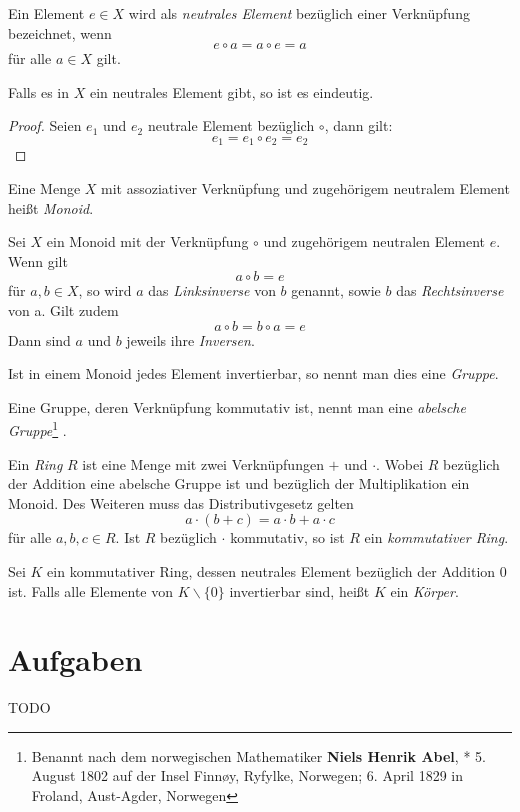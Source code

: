 \begin{definition}
Ein Element $e\in X$ wird als \textsl{neutrales Element} bezüglich einer Verknüpfung bezeichnet, wenn 
\[ e\circ a = a \circ e = a \]
für alle $a\in X$ gilt.
\end{definition}

\begin{claim}
Falls es in $X$ ein neutrales Element gibt, so ist es eindeutig. 
\end{claim}
\begin{proof}
Seien $e_1$ und $e_2$ neutrale Element bezüglich $\circ$, dann gilt: 
\[ e_1 = e_1\circ e_2 = e_2 \]
\end{proof}

\begin{definition}
Eine Menge $X$ mit assoziativer Verknüpfung und zugehörigem neutralem Element heißt \textsl{Monoid}.
\end{definition}

\begin{definition}
Sei $X$ ein Monoid mit der Verknüpfung $\circ$ und zugehörigem neutralen Element $e$. Wenn gilt
\[ a\circ b = e \]
für $a,b \in X$, so wird $a$ das \textsl{Linksinverse} von $b$ genannt, sowie $b$ das \textsl{Rechtsinverse} von a. Gilt zudem
\[ a\circ b = b \circ a = e \]
Dann sind $a$ und $b$ jeweils ihre \textsl{Inversen}. 
\end{definition}

\begin{definition}
Ist in einem Monoid jedes Element invertierbar, so nennt man dies eine \textsl{Gruppe}.
\end{definition}

\begin{definition}
Eine Gruppe, deren Verknüpfung kommutativ ist, nennt man eine \textsl{abelsche Gruppe}\footnote{Benannt nach dem norwegischen Mathematiker \textbf{Niels Henrik Abel}, * 5. August 1802 auf der Insel Finn\o y, Ryfylke, Norwegen;  6. April 1829 in Froland, Aust-Agder, Norwegen} .
\end{definition}

\begin{definition}
Ein \textsl{Ring} $R$ ist eine Menge mit zwei Verknüpfungen $+$ und $\cdot$. Wobei $R$ bezüglich der Addition eine abelsche Gruppe ist und bezüglich der Multiplikation ein Monoid. Des Weiteren muss das Distributivgesetz gelten
\[ a\cdot (b+c) = a\cdot b + a\cdot c \]
für alle $a,b,c \in R$. Ist $R$ bezüglich $\cdot$ kommutativ, so ist $R$ ein \textsl{kommutativer Ring}.
\end{definition}

\begin{definition}
Sei $K$ ein kommutativer Ring, dessen neutrales Element bezüglich der Addition $0$ ist. Falls alle Elemente von $K\backslash \{0\}$ invertierbar sind, heißt $K$ ein \textsl{Körper}.
\end{definition}

\section{Aufgaben}

TODO

